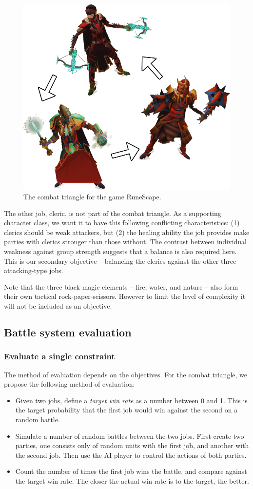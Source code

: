\begin{figure}
	\centering
	\includegraphics[width=.5\linewidth]{figures/runescape_triangle.png}
	\caption{The combat triangle for the game RuneScape.\cite{wiki-runescapecombat}}
\end{figure}

The other job, cleric, is not part of the combat triangle. As a supporting character class, we want it to have this following conflicting characteristics: (1) clerics should be weak attackers, but (2) the healing ability the job provides make parties with clerics stronger than those without. The contrast between individual weakness against group strength suggests that a balance is also required here. This is our secondary objective -- balancing the clerics against the other three attacking-type jobs.

Note that the three black magic elements -- fire, water, and nature -- also form their own tactical rock-paper-scissors. However to limit the level of complexity it will not be included as an objective.

\subsection{Battle system evaluation}
\label{sub:battleeval}

\subsubsection*{Evaluate a single constraint}

The method of evaluation depends on the objectives. For the combat triangle, we propose the following method of evaluation:
\begin{itemize}
\item Given two jobs, define a \textit{target win rate} as a number between 0 and 1. This is the target probability that the first job would win against the second on a random battle.
\item Simulate a number of random battles between the two jobs. First create two parties, one consists only of random units with the first job, and another with the second job. Then use the AI player to control the actions of both parties.
\item Count the number of times the first job wins the battle, and compare against the target win rate. The closer the actual win rate is to the target, the better.
\end{itemize}

